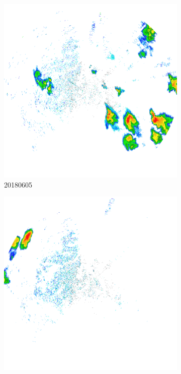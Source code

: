 \begin{figure}[ht]
\begin{subfigure}[b]{0.45\textwidth}
		\includegraphics[width=\textwidth]{./thesis_code/plots/midlothian-tx-20180605-104436-ref.png}
		\caption{20180605}
		\label{fig:classifying_datadiscovery_ex3}
	\end{subfigure}
	\begin{subfigure}[b]{0.45\textwidth}
		\includegraphics[width=\textwidth]{./thesis_code/plots/midlothian-tx-20180624-063650-ref.png}

\end{subfigure}
\end{figure}
